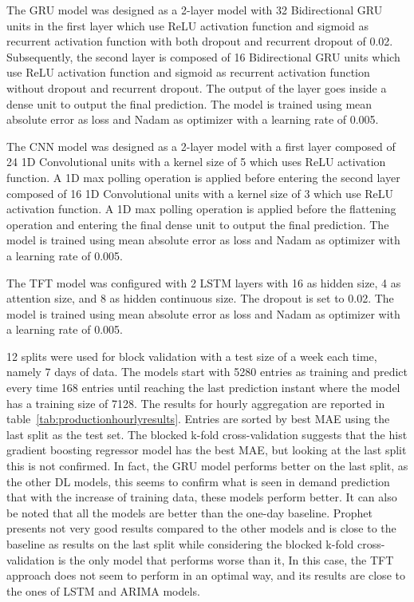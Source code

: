 The GRU model was designed as a 2-layer model with 32 Bidirectional GRU units in the first layer which use ReLU activation function and sigmoid as recurrent activation function with both dropout and recurrent dropout of 0.02.
Subsequently, the second layer is composed of 16 Bidirectional GRU units which use ReLU activation function and sigmoid as recurrent activation function without dropout and recurrent dropout.
The output of the layer goes inside a dense unit to output the final prediction.
The model is trained using mean absolute error as loss and Nadam as optimizer with a learning rate of 0.005.

The CNN model was designed as a 2-layer model with a first layer composed of 24 1D Convolutional units with a kernel size of 5 which uses ReLU activation function.
A 1D max polling operation is applied before entering the second layer composed of 16 1D Convolutional units with a kernel size of 3 which use ReLU activation function.
A 1D max polling operation is applied before the flattening operation and entering the final dense unit to output the final prediction.
The model is trained using mean absolute error as loss and Nadam as optimizer with a learning rate of 0.005.

The TFT model was configured with 2 LSTM layers with 16 as hidden size, 4 as attention size, and 8 as hidden continuous size.
The dropout is set to 0.02.
The model is trained using mean absolute error as loss and Nadam as optimizer with a learning rate of 0.005.

12 splits were used for block validation with a test size of a week each time, namely 7 days of data.
The models start with 5280 entries as training and predict every time 168 entries until reaching the last prediction instant where the model has a training size of 7128.
The results for hourly aggregation are reported in table~\ref{tab:productionhourlyresults}.
Entries are sorted by best MAE using the last split as the test set.
The blocked k-fold cross-validation suggests that the hist gradient boosting regressor model has the best MAE, but looking at the last split this is not confirmed.
In fact, the GRU model performs better on the last split, as the other DL models, this seems to confirm what is seen in demand prediction that with the increase of training data, these models perform better.
It can also be noted that all the models are better than the one-day baseline.
Prophet presents not very good results compared to the other models and is close to the baseline as results on the last split while considering the blocked k-fold cross-validation is the only model that performs worse than it,
In this case, the TFT approach does not seem to perform in an optimal way, and its results are close to the ones of LSTM and ARIMA models.

